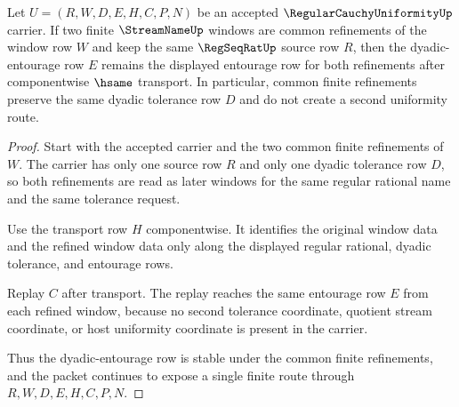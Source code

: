 \begin{theorem}
\label{thm:regular-cauchy-uniformity-dyadic-entourage-stability}
Let $U=(R,W,D,E,H,C,P,N)$ be an accepted $\RegularCauchyUniformityUp$ carrier. If two finite $\StreamNameUp$ windows are common refinements of the window row $W$ and keep the same $\RegSeqRatUp$ source row $R$, then the dyadic-entourage row $E$ remains the displayed entourage row for both refinements after componentwise $\hsame$ transport. In particular, common finite refinements preserve the same dyadic tolerance row $D$ and do not create a second uniformity route.
\end{theorem}
\begin{proof}
Start with the accepted carrier and the two common finite refinements of $W$. The carrier has only one source row $R$ and only one dyadic tolerance row $D$, so both refinements are read as later windows for the same regular rational name and the same tolerance request.

Use the transport row $H$ componentwise. It identifies the original window data and the refined window data only along the displayed regular rational, dyadic tolerance, and entourage rows.

Replay $C$ after transport. The replay reaches the same entourage row $E$ from each refined window, because no second tolerance coordinate, quotient stream coordinate, or host uniformity coordinate is present in the carrier.

Thus the dyadic-entourage row is stable under the common finite refinements, and the packet continues to expose a single finite route through $R,W,D,E,H,C,P,N$.
\end{proof}

